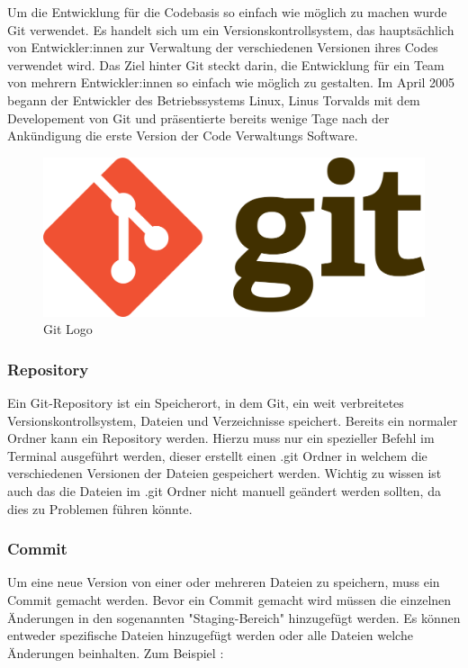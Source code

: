 Um die Entwicklung für die Codebasis so einfach wie möglich zu machen wurde Git verwendet. Es handelt sich um ein Versionskontrollsystem, das hauptsächlich von Entwickler:innen zur Verwaltung der verschiedenen Versionen ihres Codes verwendet wird. Das Ziel hinter Git steckt darin, die Entwicklung für ein Team von mehrern Entwickler:innen so einfach wie möglich zu gestalten. Im April 2005 begann der Entwickler des Betriebssystems Linux, Linus Torvalds mit dem Developement von Git und präsentierte bereits wenige Tage nach der Ankündigung die erste Version der Code Verwaltungs Software.

\begin{figure}[h!]
    \centering
    \includegraphics[width=0.5\linewidth]{pics/git-logo.png}
    \caption{Git Logo}
    \label{fig:enter-label}
\end{figure}

\cite{Git}

\subsubsection{Repository}

Ein Git-Repository ist ein Speicherort, in dem Git, ein weit verbreitetes Versionskontrollsystem, Dateien und Verzeichnisse speichert. Bereits ein normaler Ordner kann ein Repository werden. Hierzu muss nur ein spezieller Befehl im Terminal ausgeführt werden, dieser erstellt einen .git Ordner in welchem die verschiedenen Versionen der Dateien gespeichert werden. Wichtig zu wissen ist auch das die Dateien im .git Ordner nicht manuell geändert werden sollten, da dies zu Problemen führen könnte.

\subsubsection{Commit}

Um eine neue Version von einer oder mehreren Dateien zu speichern, muss ein Commit gemacht werden. Bevor ein Commit gemacht wird müssen die einzelnen Änderungen in den sogenannten "Staging-Bereich" hinzugefügt werden. Es können entweder spezifische Dateien hinzugefügt werden oder alle Dateien welche Änderungen beinhalten. Zum Beispiel :

